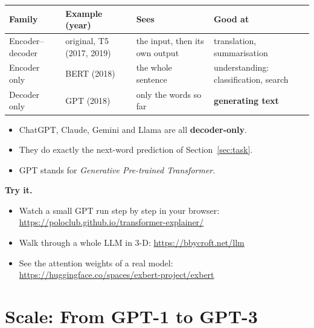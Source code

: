 \documentclass[12pt, a4paper]{article}
\begin{document}
\begin{center}
  \renewcommand{\arraystretch}{1.35}
  \begin{tabular}{>{\raggedright}p{2.7cm}>{\raggedright}p{3.0cm}>{\raggedright}p{3.4cm}>{\raggedright\arraybackslash}p{4.0cm}}
    \toprule
    Family           & Example (year)            & Sees                           & Good at                               \\
    \midrule
    Encoder--decoder & original, T5 (2017, 2019) & the input, then its own output & translation, summarisation            \\
    Encoder only     & BERT (2018)               & the whole sentence             & understanding: classification, search \\
    Decoder only     & GPT (2018)                & only the words so far          & \textbf{generating text}              \\
    \bottomrule
  \end{tabular}
\end{center}

\begin{itemize}
  \item ChatGPT, Claude, Gemini and Llama are all \textbf{decoder-only}.
  \item They do exactly the next-word prediction of Section~\ref{sec:task}.
  \item GPT stands for \emph{Generative Pre-trained Transformer}.
\end{itemize}

\begin{notebox}
  \textbf{Try it.}
  \begin{itemize}
    \item Watch a small GPT run step by step in your browser:\newline
          \url{https://poloclub.github.io/transformer-explainer/}
    \item Walk through a whole LLM in 3-D: \url{https://bbycroft.net/llm}
    \item See the attention weights of a real model:\newline
          \url{https://huggingface.co/spaces/exbert-project/exbert}
  \end{itemize}
\end{notebox}

\section{Scale: From GPT-1 to GPT-3}
\label{sec:scale}
\end{document}
